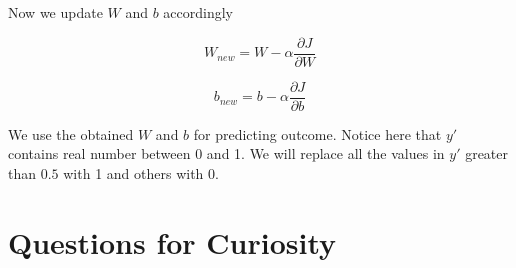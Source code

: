 Now we update $W$ and $b$ accordingly

\begin{equation}
    W_{new} = W - \alpha \frac{\partial J}{\partial W}
\end{equation}

\begin{equation}
    b_{new} = b - \alpha \frac{\partial J}{\partial b}
\end{equation}

We use the obtained $W$ and $b$ for predicting outcome. Notice here that $y'$
contains real number between 0 and 1. We will replace all the values in $y'$ greater than $0.5$
with 1 and others with 0.

\section{Questions for Curiosity}